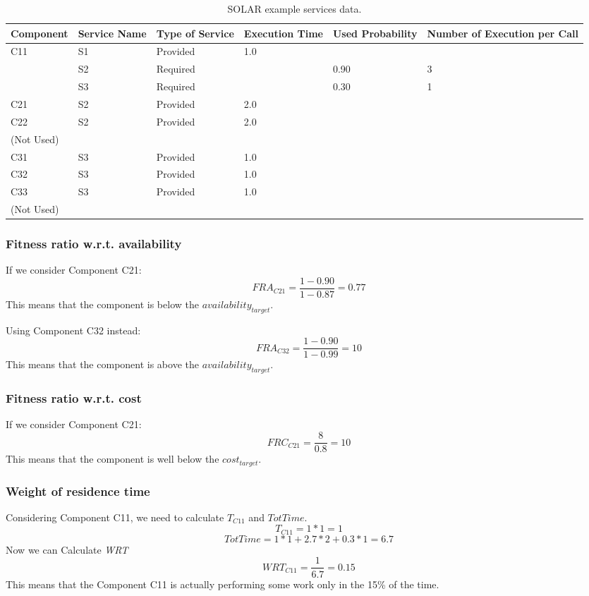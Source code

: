 \begin{table}[ht!b]
	\centering
	\begin{tabular}{|p{2cm}|p{2.5cm}|p{1.4cm}|p{1.7cm}|p{1.5cm}|p{1.8cm}|}
		\hline 
		\textbf{Component} & \textbf{Service Name} & \textbf{Type of Service} & \textbf{Execution Time} & \textbf{Used Probability} & \textbf{Number of Execution per Call} \\ 
		\hline 
		\multirow{3}{*}{C11} & S1 & Provided & 1.0 & & \\\cline{2-6}
		& S2 & Required & & 0.90 & 3 \\
		& S3 & Required & & 0.30 & 1 \\
		\hline 
		C21 & S2 & Provided & 2.0 & & \\
		\hline 
		C22 & \multirow{2}{*}{S2} & \multirow{2}{*}{Provided} & \multirow{2}{*}{2.0} & & \\
		(Not Used) & & & & & \\
		\hline 
		C31 & S3 & Provided & 1.0 & & \\
		\hline
		C32 & S3 & Provided & 1.0 & & \\
		\hline
		C33 & \multirow{2}{*}{S3} & \multirow{2}{*}{Provided} &\multirow{2}{*}{1.0} & & \\
		(Not Used) & & & & & \\
		\hline
	\end{tabular} 
	\caption[SOLAR Services data]{SOLAR example services data.}
	\label{tab:solar-serv-specs}
\end{table}

\subsubsection{Fitness ratio w.r.t. availability}
If we consider Component C21:
\[ FRA_{C21} = \frac{1-0.90}{1-0.87} = 0.77 \]
This means that the component is below the \emph{$availability_{target}$}.

\noindent Using Component C32 instead:
\[ FRA_{C32} = \frac{1-0.90}{1-0.99} = 10 \]
This means that the component is above the \emph{$availability_{target}$}.
\subsubsection{Fitness ratio w.r.t. cost}
If we consider Component C21:
\[FRC_{C21} = \frac{8}{0.8}=10\]
This means that the component is well below the \emph{$cost_{target}$}.
\subsubsection{Weight of residence time}
Considering Component C11, we need to calculate $T_{C11}$ and $TotTime$.
\[T_{C11} = 1 * 1 = 1\]
\[TotTime = 1 * 1 + 2.7 * 2 + 0.3 * 1 = 6.7\]
Now we can Calculate \emph{WRT}
\[WRT_{C11} = \frac{1}{6.7} = 0.15\]
This means that the Component C11 is actually performing some work only in the 15\% of the time.
